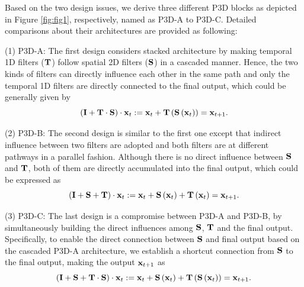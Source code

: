 \documentclass[10pt,twocolumn,letterpaper]{article}
\begin{document}
Based on the two design issues, we derive three different P3D blocks as depicted in Figure \ref{fig:fig1}, respectively, named as P3D-A to P3D-C. Detailed comparisons about their architectures are provided as following:

(1) P3D-A: The first design considers stacked architecture by making temporal 1D filters (${\bf{T}}$) follow spatial 2D filters (${\bf{S}}$) in a cascaded manner. Hence, the two kinds of filters can directly influence each other in the same path and only the temporal 1D filters are directly connected to the final output, which could be generally given by
\begin{equation}\label{Eq:Eq3}\small
\left({{\bf{I}} + {\bf{T}}\cdot{\bf{S}}}\right)\cdot {{\bf{x}}_t} := {{\bf{x}}_t} + {\bf{T}}\left( {{\bf{S}}\left( {{{\bf{x}}_t}} \right)} \right)={{\bf{x}}_{t + 1}}.
\end{equation}


(2) P3D-B: The second design is similar to the first one except that indirect influence between two filters are adopted and both filters are at different pathways in a parallel fashion. Although there is no direct influence between ${\bf{S}}$ and ${\bf{T}}$, both of them are directly accumulated into the final output, which could be expressed as
\begin{equation}\label{Eq:Eq4}\small
\left({{\bf{I}} + {\bf{S}}+{\bf{T}}}\right)\cdot {{\bf{x}}_t} := {{\bf{x}}_t} + {\bf{S}}\left( {{{\bf{x}}_t}} \right) + {\bf{T}}\left( {{{\bf{x}}_t}} \right)={{\bf{x}}_{t + 1}}.
\end{equation}

(3) P3D-C: The last design is a compromise between P3D-A and P3D-B, by simultaneously building the direct influences among ${\bf{S}}$, ${\bf{T}}$ and the final output. Specifically, to enable the direct connection between ${\bf{S}}$ and final output based on the cascaded P3D-A architecture, we establish a shortcut connection from ${\bf{S}}$ to the final output, making the output ${{\bf{x}}_{t + 1}}$ as
\begin{equation}\label{Eq:Eq5}\small
\left({{\bf{I}} + {\bf{S}} + {\bf{T}}\cdot{\bf{S}}}\right)\cdot {{\bf{x}}_t} := {{\bf{x}}_t} + {\bf{S}}\left( {{{\bf{x}}_t}} \right) + {\bf{T}}\left( {{\bf{S}}\left( {{{\bf{x}}_t}} \right)} \right)={{\bf{x}}_{t + 1}}.
\end{equation}
\end{document}

